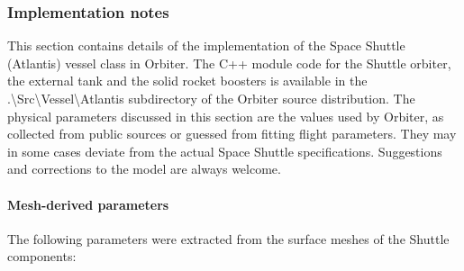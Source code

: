 \documentclass[Orbiter User Manual.tex]{subfiles}
\begin{document}
\subsubsection{Implementation notes}
This section contains details of the implementation of the Space Shuttle (Atlantis) vessel class in Orbiter. The C++ module code for the Shuttle orbiter, the external tank and the solid rocket boosters is available in the .\textbackslash Src\textbackslash Vessel\textbackslash Atlantis subdirectory of the Orbiter source distribution. The physical parameters discussed in this section are the values used by Orbiter, as collected from public sources or guessed from fitting flight parameters. They may in some cases deviate from the actual Space Shuttle specifications. Suggestions and corrections to the model are always welcome.

\paragraph{Mesh-derived parameters}
The following parameters were extracted from the surface meshes of the Shuttle components:
\end{document}
